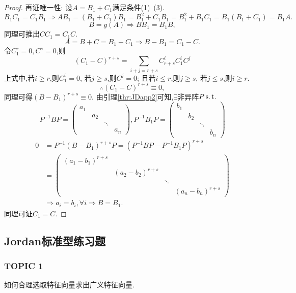 \begin{proof}
    {\heiti 再证唯一性:}
    设$A=B_1+C_1$满足条件(1)~(3).
    \[ B_1C_1=C_1B_1 \Longrightarrow
      AB_1=(B_1+C_1)B_1=B_1^2+C_1B_1=B_1^2+B_1C_1=
      B_1(B_1+C_1)=B_1A.\]
    \[ B=g(A)\Longrightarrow BB_1=B_1B, \]
    同理可推出$CC_1=C_1C$.
    \[ A=B+C=B_1+C_1 \Longrightarrow B-B_1=C_1-C.\]
    令$C_1^r=0, C^s=0$,则
    \[(C_1-C)^{r+s}=
      \sum_{i+j=r+s}C_{r+s}^iC_1^iC^j
    \]
    上式中,若$i \geq r$,则$C_1^i=0$,
    若$j \geq s$,则$C^j=0$;
    且若$i \leq r$,则$j \geq s$,
    若$j \leq s$,则$i \geq r$.
    \[\therefore (C_1-C)^{r+s}\equiv 0,\]
    同理可得$(B-B_1)^{r+s}\equiv 0$.
    由引理\ref{thr:JDapp2}可知,$\exists$非异阵$P \operatorname{s.t.{}}$
    \[P^{-1}BP=
      \begin{pmatrix}
        a_1&&&\\
           &a_2&&\\
           &&\ddots&\\
        &&&a_n
      \end{pmatrix}, P^{-1}B_1P=
      \begin{pmatrix}
        b_1&&&\\
           &b_2&&\\
           &&\ddots&\\
        &&&b_n
      \end{pmatrix}\]
    \begin{align*}
    0& =P^{-1}(B-B_1)^{r+s}P=(P^{-1}BP-P^{-1}B_1P)^{r+s}\\
     & =
      \begin{pmatrix}
        (a_1-b_1)^{r+s}&&&\\
                       &(a_2-b_2)^{r+s}&&\\
                       &&\ddots&\\
        &&&(a_n-b_n)^{r+s}
      \end{pmatrix}\\
     & \Longrightarrow a_i=b_i, \forall i
       \Longrightarrow B = B_1.
    \end{align*}
    同理可证$C_1=C$.
  \end{proof}

\subsection{Jordan标准型练习题}

\subsubsection{TOPIC 1}
如何合理选取特征向量求出广义特征向量.

